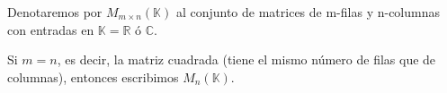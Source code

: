 \documentclass[12pt]{article}
\begin{document}

Denotaremos por $M_{m\times n}(\mathbb{K})$ al conjunto de
matrices de m-filas y n-columnas con entradas en
$\mathbb{K}=\mathbb{R}$ ó $\mathbb{C}$.

Si $m=n$, es decir, la matriz cuadrada (tiene el mismo número de
filas que de columnas), entonces escribimos $M_n(\mathbb{K})$.
\end{document}

